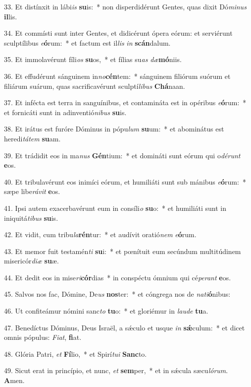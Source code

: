 33. Et distínxit in lábi\textit{is} \textbf{su}is:~*  non disperdidérunt Gentes, quas dixit Dó\textit{mi}\textit{nus} \textbf{il}lis.\

34. Et commísti sunt inter Gentes, et didicérunt ópera eórum: et serviérunt sculptílibus \textit{e}\textbf{ó}rum:~*  et factum est il\textit{lis} \textit{in} \textbf{scán}dalum.\

35. Et immolavérunt fíli\textit{os} \textbf{su}os,~*  et fílias su\textit{as} \textit{dæ}\textbf{mó}niis.\

36. Et effudérunt sánguinem in\textit{no}\textbf{cén}tem:~*  sánguinem filiórum suórum et filiárum suárum, quas sacrificavérunt sculptí\textit{li}\textit{bus} \textbf{Chá}naan.\

37. Et infécta est terra in sanguínibus, et contamináta est in opéribus \textit{e}\textbf{ó}rum:~*  et fornicáti sunt in adinventió\textit{ni}\textit{bus} \textbf{su}is.\

38. Et irátus est furóre Dóminus in pópu\textit{lum} \textbf{su}um:~*  et abominátus est heredi\textit{tá}\textit{tem} \textbf{su}am.\

39. Et trádidit eos in ma\textit{nus} \textbf{Gén}tium:~*  et domináti sunt eórum qui o\textit{dé}\textit{runt} \textbf{e}os.\

40. Et tribulavérunt eos inimíci eórum, et humiliáti sunt sub mánibus \textit{e}\textbf{ó}rum:~*  sæpe libe\textit{rá}\textit{vit} \textbf{e}os.\

41. Ipsi autem exacerbavérunt eum in consíli\textit{o} \textbf{su}o:~*  et humiliáti sunt in iniquitá\textit{ti}\textit{bus} \textbf{su}is.\

42. Et vidit, cum tribu\textit{la}\textbf{rén}tur:~*  et audívit oratió\textit{nem} \textit{e}\textbf{ó}rum.\

43. Et memor fuit testamén\textit{ti} \textbf{su}i:~*  et pœnítuit eum secúndum multitúdinem misericór\textit{di}\textit{æ} \textbf{su}æ.\

44. Et dedit eos in mise\textit{ri}\textbf{cór}dias~*  in conspéctu ómnium qui cé\textit{pe}\textit{rant} \textbf{e}os.\

45. Salvos nos fac, Dómine, De\textit{us} \textbf{nos}ter:~*  et cóngrega nos de \textit{na}\textit{ti}\textbf{ó}nibus:\

46. Ut confiteámur nómini sanc\textit{to} \textbf{tu}o:~*  et gloriémur in \textit{lau}\textit{de} \textbf{tu}a.\

47. Benedíctus Dóminus, Deus Israël, a sǽculo et usque \textit{in} \textbf{sǽ}culum:~*  et dicet omnis pópulus: \textit{Fi}\textit{at}, \textbf{fi}at.\

48. Glória Patri, \textit{et} \textbf{Fí}lio,~*  et Spirí\textit{tu}\textit{i} \textbf{Sanc}to.\

49. Sicut erat in princípio, et nunc, \textit{et} \textbf{sem}per,~*  et in sǽcula sæcu\textit{ló}\textit{rum}. \textbf{A}men.\

